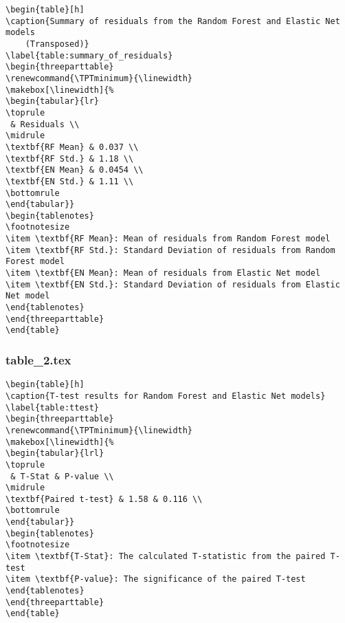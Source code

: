 \documentclass[11pt]{article}
\begin{document}
\begin{Verbatim}[tabsize=4]
\begin{table}[h]
\caption{Summary of residuals from the Random Forest and Elastic Net models
	(Transposed)}
\label{table:summary_of_residuals}
\begin{threeparttable}
\renewcommand{\TPTminimum}{\linewidth}
\makebox[\linewidth]{%
\begin{tabular}{lr}
\toprule
 & Residuals \\
\midrule
\textbf{RF Mean} & 0.037 \\
\textbf{RF Std.} & 1.18 \\
\textbf{EN Mean} & 0.0454 \\
\textbf{EN Std.} & 1.11 \\
\bottomrule
\end{tabular}}
\begin{tablenotes}
\footnotesize
\item \textbf{RF Mean}: Mean of residuals from Random Forest model
\item \textbf{RF Std.}: Standard Deviation of residuals from Random Forest model
\item \textbf{EN Mean}: Mean of residuals from Elastic Net model
\item \textbf{EN Std.}: Standard Deviation of residuals from Elastic Net model
\end{tablenotes}
\end{threeparttable}
\end{table}

\end{Verbatim}

\subsubsection*{table\_2.tex}

\begin{Verbatim}[tabsize=4]
\begin{table}[h]
\caption{T-test results for Random Forest and Elastic Net models}
\label{table:ttest}
\begin{threeparttable}
\renewcommand{\TPTminimum}{\linewidth}
\makebox[\linewidth]{%
\begin{tabular}{lrl}
\toprule
 & T-Stat & P-value \\
\midrule
\textbf{Paired t-test} & 1.58 & 0.116 \\
\bottomrule
\end{tabular}}
\begin{tablenotes}
\footnotesize
\item \textbf{T-Stat}: The calculated T-statistic from the paired T-test
\item \textbf{P-value}: The significance of the paired T-test
\end{tablenotes}
\end{threeparttable}
\end{table}

\end{Verbatim}
\end{document}
